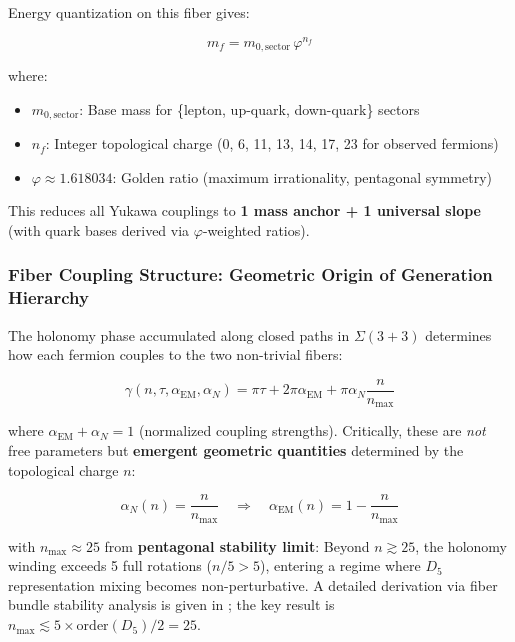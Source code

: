 \documentclass[12pt]{article}
\begin{document}
Energy quantization on this fiber gives:

\begin{equation}
\boxed{m_f = m_{0,\text{sector}} \, \varphi^{n_f}}
\end{equation}

where:
\begin{itemize}
\item \textbf{$m_{0,\text{sector}}$}: Base mass for \{lepton, up-quark, down-quark\} sectors
\item \textbf{$n_f$}: Integer topological charge (0, 6, 11, 13, 14, 17, 23 for observed fermions)
\item \textbf{$\varphi \approx 1.618034$}: Golden ratio (maximum irrationality, pentagonal symmetry)
\end{itemize}

This reduces all Yukawa couplings to \textbf{1 mass anchor + 1 universal slope} (with quark bases derived via $\varphi$-weighted ratios).

\subsubsection{Fiber Coupling Structure: Geometric Origin of Generation Hierarchy}

The holonomy phase accumulated along closed paths in $\Sigma(3+3)$ determines how each fermion couples to the two non-trivial fibers:

\begin{equation}
\gamma(n, \tau, \alpha_{\text{EM}}, \alpha_N) = \pi\tau + 2\pi\alpha_{\text{EM}} + \pi\alpha_N\frac{n}{n_{\max}}
\end{equation}

where $\alpha_{\text{EM}} + \alpha_N = 1$ (normalized coupling strengths). Critically, these are \textit{not} free parameters but \textbf{emergent geometric quantities} determined by the topological charge $n$:

\begin{equation}
\alpha_N(n) = \frac{n}{n_{\max}} \quad \Rightarrow \quad \alpha_{\text{EM}}(n) = 1 - \frac{n}{n_{\max}}
\end{equation}

with $n_{\max} \approx 25$ from \textbf{pentagonal stability limit}: Beyond $n \gtrsim 25$, the holonomy winding exceeds 5 full rotations ($n/5 > 5$), entering a regime where $D_5$ representation mixing becomes non-perturbative. A detailed derivation via fiber bundle stability analysis is given in \cite{goe_protocol_2025}; the key result is $n_{\max} \lesssim 5 \times \text{order}(D_5) / 2 = 25$.
\end{document}

